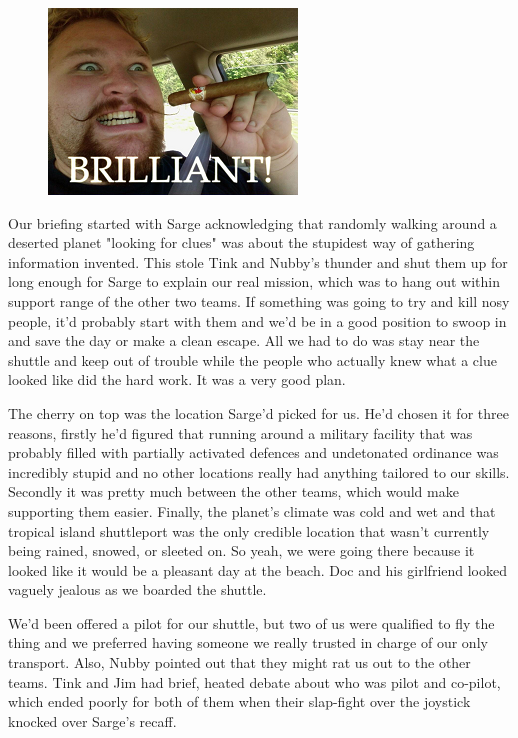\begin{figure}
	\begin{center}
		\includegraphics[width=\figwidth]{pics/11/14.png}
	\end{center}
\end{figure}
Our briefing started with Sarge acknowledging that randomly walking around a deserted planet "looking for clues" was about the stupidest way of gathering information invented. 
This stole Tink and Nubby's thunder and shut them up for long enough for Sarge to explain our real mission, which was to hang out within support range of the other two teams. 
If something was going to try and kill nosy people, it'd probably start with them and we'd be in a good position to swoop in and save the day or make a clean escape. 
All we had to do was stay near the shuttle and keep out of trouble while the people who actually knew what a clue looked like did the hard work. 
It was a very good plan.

The cherry on top was the location Sarge'd picked for us. 
He'd chosen it for three reasons, firstly he'd figured that running around a military facility that was probably filled with partially activated defences and undetonated ordinance was incredibly stupid and no other locations really had anything tailored to our skills. 
Secondly it was pretty much between the other teams, which would make supporting them easier. 
Finally, the planet's climate was cold and wet and that tropical island shuttleport was the only credible location that wasn't currently being rained, snowed, or sleeted on. 
So yeah, we were going there because it looked like it would be a pleasant day at the beach. 
Doc and his girlfriend looked vaguely jealous as we boarded the shuttle.

We'd been offered a pilot for our shuttle, but two of us were qualified to fly the thing and we preferred having someone we really trusted in charge of our only transport. 
Also, Nubby pointed out that they might rat us out to the other teams. 
Tink and Jim had brief, heated debate about who was pilot and co-pilot, which ended poorly for both of them when their slap-fight over the joystick knocked over Sarge's recaff.

